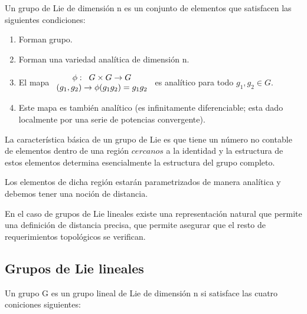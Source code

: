 Un grupo de Lie de dimensión n es un conjunto de elementos que satisfacen las siguientes condiciones:

\begin{enumerate}
\item Forman grupo.
\item Forman una variedad analítica de dimensión n.
\item El mapa $\begin{array}{cc}
\phi: \hspace{0.2cm} G\times G \to G  \\
(g_1,g_2)\to \phi (g_1g_2)=g_1g_2
\end{array}$ es analítico para todo $g_1,g_2 \in G$.
\item Este mapa es también analítico (es infinitamente diferenciable; esta dado localmente por una serie de potencias convergente).
\end{enumerate}

La característica básica de un grupo de Lie es que tiene un número no contable de elementos dentro de una región $\textit{cercanos}$ a la identidad y la estructura de estos elementos determina esencialmente la estructura del grupo completo.

\smallskip
Los elementos de dicha región estarán parametrizados de manera analítica y debemos tener una noción de distancia.

En el caso de grupos de Lie lineales existe una representación natural que permite una definición de distancia precisa, que permite asegurar que el resto de requerimientos topológicos se verifican.

\subsection{Grupos de Lie lineales}

Un grupo G es un grupo lineal de Lie de dimensión n si satisface las cuatro coniciones siguientes:

